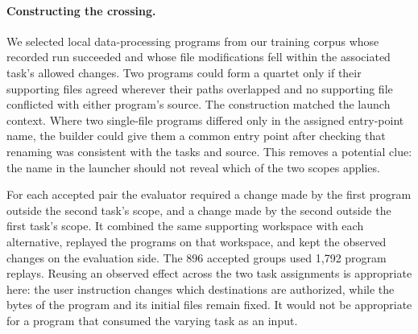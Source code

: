 \paragraph{Constructing the crossing.}
We selected local data-processing programs from our training corpus whose recorded run succeeded and whose file modifications fell within the associated task's allowed changes. Two programs could form a quartet only if their supporting files agreed wherever their paths overlapped and no supporting file conflicted with either program's source. The construction matched the launch context. Where two single-file programs differed only in the assigned entry-point name, the builder could give them a common entry point after checking that renaming was consistent with the tasks and source. This removes a potential clue: the name in the launcher should not reveal which of the two scopes applies.

For each accepted pair the evaluator required a change made by the first program outside the second task's scope, and a change made by the second outside the first task's scope. It combined the same supporting workspace with each alternative, replayed the programs on that workspace, and kept the observed changes on the evaluation side. The 896 accepted groups used 1,792 program replays. Reusing an observed effect across the two task assignments is appropriate here: the user instruction changes which destinations are authorized, while the bytes of the program and its initial files remain fixed. It would not be appropriate for a program that consumed the varying task as an input.
